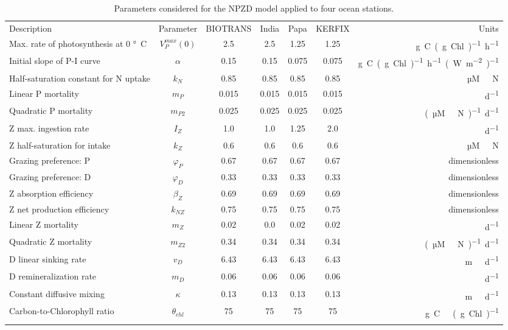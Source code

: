 \documentclass[journal abbreviation, manuscript]{copernicus}
\begin{document}
%
\begin{table}[t]
\caption{Parameters considered for the NPZD model applied to four ocean stations.}
\begin{tabular}{l c c c c c r}
\tophline
Description & Parameter & BIOTRANS & India & Papa & KERFIX & Units \\
\middlehline

Max. rate of photosynthesis at 0 \unit{\degree C} & $V_P^{max}(0)$ & 2.5 & 2.5 & 1.25 & 1.25 & \unit{g C (g Chl)^{-1} h^{-1}}\\
Initial slope of P-I curve & $\alpha$ & 0.15 & 0.15 & 0.075 & 0.075 & \unit{g C (g Chl)^{-1} h^{-1} (W m^{-2})^{-1}}\\
Half-saturation constant for N uptake & $k_N$ & 0.85  & 0.85  & 0.85  & 0.85 & \unit{µM \ N} \\
Linear P mortality & $m_P$ & 0.015 & 0.015 & 0.015 & 0.015  & \unit{d^{−1}} \\
Quadratic P mortality & $m_{P2}$ & 0.025 & 0.025 & 0.025 & 0.025 & \unit{(µM \ N)^{-1} d^{−1}} \\
Z max. ingestion rate & $I_Z$ & 1.0 & 1.0 & 1.25 & 2.0 & \unit{d^{−1}} \\
Z half-saturation for intake & $k_Z$ & 0.6 & 0.6 & 0.6 & 0.6 & \unit{µM \ N} \\
Grazing preference: P & $\varphi_P$ & 0.67 & 0.67 & 0.67 & 0.67 & dimensionless\\
Grazing preference: D & $\varphi_D$ & 0.33 & 0.33 & 0.33 & 0.33 & dimensionless\\
Z absorption efficiency & $\beta_Z$ & 0.69 & 0.69 & 0.69 & 0.69 & dimensionless\\
Z net production efficiency & $k_{NZ}$ & 0.75 & 0.75 & 0.75 &  0.75 & dimensionless\\
Linear Z mortality & $m_Z$ & 0.02 & 0.0 & 0.02 & 0.02 & \unit{d^{−1}} \\
Quadratic Z mortality & $m_{Z2}$ & 0.34 & 0.34 & 0.34 & 0.34 & \unit{(µM \ N)^{-1} d^{−1}}  \\
D linear sinking rate & $v_D$ & 6.43 & 6.43 & 6.43 & 6.43 & \unit{m \ d^{−1}}\\
D remineralization rate & $m_D$ & 0.06 & 0.06 & 0.06 & 0.06 & \unit{d^{−1}} \\
Constant diffusive mixing & $\kappa$ & 0.13 & 0.13 & 0.13 & 0.13 & \unit{m \ d^{−1}}\\
Carbon-to-Chlorophyll ratio & $\theta_{chl}$ &  75 & 75 & 75 & 75 & \unit{g C \ (g Chl)^{−1}} \\

\bottomhline
\end{tabular}
\label{Table:EMPOWERparams}
\end{table}
%
\end{document}
